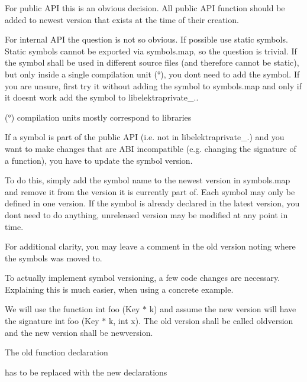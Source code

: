 For public A\+PI this is an obvious decision. All public A\+PI function should be added to newest version that exists at the time of their creation.

For internal A\+PI the question is not so obvious. If possible use static symbols. Static symbols cannot be exported via {\ttfamily symbols.\+map}, so the question is trivial. If the symbol shall be used in different source files (and therefore cannot be static), but only inside a single compilation unit (°), you don\textquotesingle{}t need to add the symbol. If you are unsure, first try it without adding the symbol to {\ttfamily symbols.\+map} and only if it doesn\textquotesingle{}t work add the symbol to {\ttfamily libelektraprivate\+\_.}.

(°) compilation units mostly correspond to libraries

If a symbol is part of the public A\+PI (i.\+e. not in {\ttfamily libelektraprivate\+\_.}) and you want to make changes that are A\+BI incompatible (e.\+g. changing the signature of a function), you have to update the symbol version.

To do this, simply add the symbol name to the newest version in {\ttfamily symbols.\+map} and remove it from the version it is currently part of. Each symbol may only be defined in one version. If the symbol is already declared in the latest version, you don\textquotesingle{}t need to do anything, unreleased version may be modified at any point in time.

For additional clarity, you may leave a comment in the old version noting where the symbols was moved to.

To actually implement symbol versioning, a few code changes are necessary. Explaining this is much easier, when using a concrete example.

We will use the function {\ttfamily int foo (Key $\ast$ k)} and assume the new version will have the signature {\ttfamily int foo (Key $\ast$ k, int x)}. The old version shall be called {\ttfamily oldversion} and the new version shall be {\ttfamily newversion}.

The old function declaration


\begin{DoxyCode}{0}
\end{DoxyCode}


has to be replaced with the new declarations


\begin{DoxyCode}{0}
\DoxyCodeLine{}
\end{DoxyCode}


